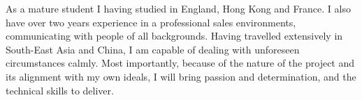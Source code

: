 \documentclass[11pt, a4paper]{awesome-cv}
\begin{document}
\begin{cvletter}
As a mature student I having studied in England, Hong Kong and France. I also have over two years experience in a professional sales environments, communicating with people of all backgrounds. Having travelled extensively in South-East Asia and China, I am capable of dealing with unforeseen circumstances calmly.
Most importantly, because of the nature of the project and its alignment with my own ideals, I will bring passion and determination, and the technical skills to deliver.

\end{cvletter}

\makeletterclosing
\end{document}
